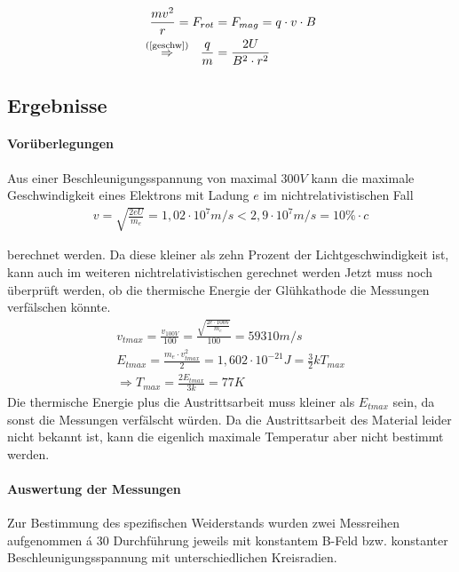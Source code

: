 \documentclass[11pt, a4paper]{article}
\begin{document}
    \begin{align}
        \frac{mv^2}{r} = F_{rot} &= F_{mag} = q \cdot v \cdot B \\
        \overset{\text{(\ref{geschw})}}{\Rightarrow} \ \  \frac{q}{m} &= \frac{2U}{B^2 \cdot r^2} \label{qm_formel}
    \end{align}

    \subsection{Ergebnisse}
    \paragraph{Vorüberlegungen}

    Aus einer Beschleunigungsspannung von maximal $300 \si{V}$ kann die maximale Geschwindigkeit eines Elektrons mit Ladung $e$ im nichtrelativistischen Fall
    \begin{align}
        v = \sqrt{\frac{2 e U}{m_e}} = 1,02 \cdot 10^{7} \si{m/s} < 2,9 \cdot 10^{7} \si{m/s} = 10\% \cdot c
    \end{align}


    berechnet werden. Da diese kleiner als zehn Prozent der Lichtgeschwindigkeit ist, kann auch im weiteren nichtrelativistischen gerechnet werden
    Jetzt muss noch überprüft werden, ob die thermische Energie der Glühkathode die Messungen verfälschen könnte.
    \begin{align}
        v_{tmax} = \frac{v_{100V}}{100} = \frac{\sqrt{\frac{2 e \cdot 100 \si{V}}{m_e}}}{100} = 59310 \si{m \per s} \\
        E_{tmax} = \frac{m_e \cdot v_{tmax}^2}{2} = 1,602 \cdot 10^{-21} \si{J} = \frac{3}{2} k T_{max} \\
        \Rightarrow T_{max} = \frac{2 E_{tmax}}{3 k} = 77K
    \end{align}
    Die thermische Energie plus die Austrittsarbeit muss kleiner als $E_{tmax}$ sein, da sonst die Messungen verfälscht würden. Da die Austrittsarbeit des Material leider nicht bekannt ist, kann die eigenlich maximale Temperatur aber nicht bestimmt werden.


    \paragraph{Auswertung der Messungen}
        Zur Bestimmung des spezifischen Weiderstands wurden zwei Messreihen aufgenommen \'{a} 30 Durchführung jeweils mit konstantem B-Feld bzw. konstanter Beschleunigungsspannung mit unterschiedlichen Kreisradien.
        
\end{document}
